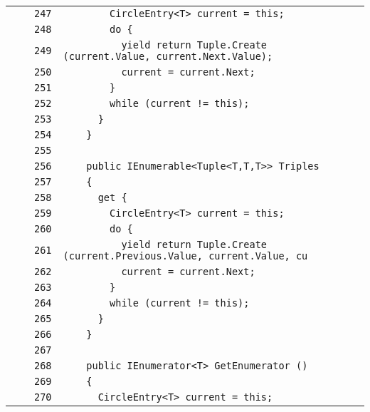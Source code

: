 \documentclass[a4paper,10pt]{article}
\begin{document}
\begin{longtable}[l]{lrrl}
\cellcolor{gray} &  & \verb~247~ & \verb~        CircleEntry<T> current = this;~\\
\cellcolor{gray} &  & \verb~248~ & \verb~        do {~\\
\cellcolor{gray} &  & \verb~249~ & \verb~          yield return Tuple.Create (current.Value, current.Next.Value);~\\
\cellcolor{gray} &  & \verb~250~ & \verb~          current = current.Next;~\\
\cellcolor{gray} &  & \verb~251~ & \verb~        }~\\
\cellcolor{gray} &  & \verb~252~ & \verb~        while (current != this);~\\
\cellcolor{gray} &  & \verb~253~ & \verb~      }~\\
\cellcolor{gray} &  & \verb~254~ & \verb~    }~\\
\cellcolor{gray} &  & \verb~255~ & \verb~~\\
\cellcolor{gray} &  & \verb~256~ & \verb~    public IEnumerable<Tuple<T,T,T>> Triples~\\
\cellcolor{gray} &  & \verb~257~ & \verb~    {~\\
\cellcolor{gray} &  & \verb~258~ & \verb~      get {~\\
\cellcolor{gray} &  & \verb~259~ & \verb~        CircleEntry<T> current = this;~\\
\cellcolor{gray} &  & \verb~260~ & \verb~        do {~\\
\cellcolor{gray} &  & \verb~261~ & \verb~          yield return Tuple.Create (current.Previous.Value, current.Value, cu~\\
\cellcolor{gray} &  & \verb~262~ & \verb~          current = current.Next;~\\
\cellcolor{gray} &  & \verb~263~ & \verb~        }~\\
\cellcolor{gray} &  & \verb~264~ & \verb~        while (current != this);~\\
\cellcolor{gray} &  & \verb~265~ & \verb~      }~\\
\cellcolor{gray} &  & \verb~266~ & \verb~    }~\\
\cellcolor{gray} &  & \verb~267~ & \verb~~\\
\cellcolor{gray} &  & \verb~268~ & \verb~    public IEnumerator<T> GetEnumerator ()~\\
\cellcolor{gray} &  & \verb~269~ & \verb~    {~\\
\cellcolor{gray} &  & \verb~270~ & \verb~      CircleEntry<T> current = this;~\\

\end{longtable}
\end{document}
